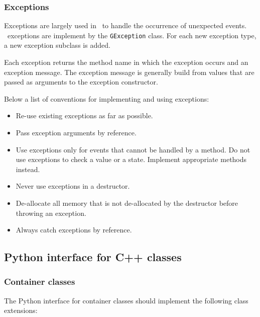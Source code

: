 \documentclass{article}[12pt,a4]
\begin{document}
\subsubsection{Exceptions}
\label{sec:exceptions}

Exceptions are largely used in \this\ to handle the occurrence of unexpected events.
\this\ exceptions are implement by the {\tt GException} class.
For each new exception type, a new exception subclass is added.

Each exception returns the method name in which the exception occurs and an exception
message.
The exception message is generally build from values that are passed as arguments to the
exception constructor.

Below a list of conventions for implementing and using exceptions:
\begin{itemize}
\item Re-use existing exceptions as far as possible.
\item Pass exception arguments by reference.
\item Use exceptions only for events that cannot be handled by a method.
Do not use exceptions to check a value or a state. Implement appropriate methods instead.
\item Never use exceptions in a destructor.
\item De-allocate all memory that is not de-allocated by the destructor before throwing an
exception. 
\item Always catch exceptions by reference.
\end{itemize}


\subsection{Python interface for C++ classes}

\subsubsection{Container classes}

The Python interface for container classes should implement the following class extensions:
\end{document}
